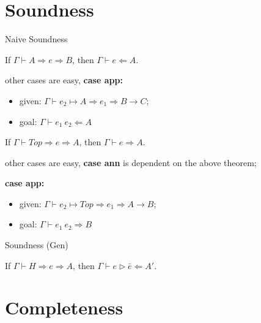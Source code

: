 \section{Soundness}


\begin{frame}{Naive Soundness}
\begin{theorem}
If $\Gamma \vdash A \Rightarrow e \Rightarrow B$, then $\Gamma \vdash e \Leftarrow A$.
\end{theorem}

other cases are easy, \textbf{case app:}
\begin{itemize}
	\item given: $\Gamma \vdash \boxed{e_2} \mapsto A \Rightarrow e_1 \Rightarrow B \rightarrow C$;
	\item goal: $\Gamma \vdash e_1 ~ e_2 \Leftarrow A$
\end{itemize}

\begin{theorem}
If $\Gamma \vdash Top \Rightarrow e \Rightarrow A$, then $\Gamma \vdash e \Rightarrow A$.
\end{theorem}

other cases are easy, \textbf{case ann} is dependent on the above theorem;

\textbf{case app:}

\begin{itemize}
	\item given: $\Gamma \vdash \boxed{e_2} \mapsto Top \Rightarrow e_1 \Rightarrow A \rightarrow B$;
	\item goal: $\Gamma \vdash e_1 ~ e_2 \Rightarrow B$
\end{itemize}

\end{frame}

\begin{frame}{Soundness (Gen)}

\begin{lemma}[Soundness]
If $\Gamma \vdash H \Rightarrow e \Rightarrow A$, then $\Gamma \vdash e \vartriangleright \bar{e} \Leftarrow A'$.
\end{lemma}

\end{frame}

\section{Completeness}

